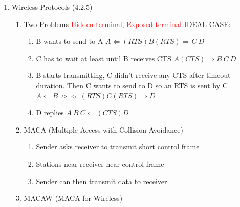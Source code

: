 \documentclass[a4paper,10pt]{article}
\newcommand{\red}[1]{\textcolor{red}{#1}}
\begin{document}
\begin{enumerate}
  \item Wireless Protocols (4.2.5)
    \begin{enumerate}
      \item Two Problems
        \newline \red{Hidden terminal}, \red{Exposed terminal}
        \newline IDEAL CASE:
        \begin{enumerate}
          \item B wants to send to A
            \newline $ A \Leftarrow (RTS)B(RTS) \Rightarrow C\ D $
          \item C has to wait at least until B receives CTS
            \newline $ A(CTS) \Rightarrow B\ C\ D $
          \item B starts transmitting, C didn't receive any CTS after timeout duration. Then C wants to send to D so an RTS is sent by C
            \newline $ A \Leftarrow B \nRightarrow \nLeftarrow (RTS)C(RTS) \Rightarrow D $
          \item D replies
            \newline $ A\ B\ C \Leftarrow (CTS)D $
        \end{enumerate}
      \item MACA (Multiple Access with Collision Avoidance)
        \begin{enumerate}
          \item Sender asks receiver to transmit short control frame
          \item Stations near receiver hear control frame
          \item Sender can then transmit data to receiver
        \end{enumerate}
      \item MACAW (MACA for Wireless)
    \end{enumerate}
  

\end{enumerate}
\end{document}

